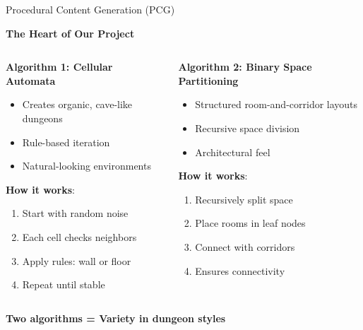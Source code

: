 \documentclass{beamer}
\begin{document}
\begin{frame}{Procedural Content Generation (PCG)}
    \begin{center}
        \textbf{The Heart of Our Project}
    \end{center}

    \begin{columns}[T]
        \begin{column}{0.48\textwidth}
            \textbf{Algorithm 1: Cellular Automata}
            \begin{itemize}
                \item Creates organic, cave-like dungeons
                \item Rule-based iteration
                \item Natural-looking environments
            \end{itemize}

            \vspace{0.6cm}
            \textbf{How it works}:
            \begin{enumerate}\small
                \item Start with random noise
                \item Each cell checks neighbors
                \item Apply rules: wall or floor
                \item Repeat until stable
            \end{enumerate}
        \end{column}

        \begin{column}{0.48\textwidth}
            \textbf{Algorithm 2: Binary Space Partitioning}
            \begin{itemize}
                \item Structured room-and-corridor layouts
                \item Recursive space division
                \item Architectural feel
            \end{itemize}

            \vspace{0.2cm}
            \textbf{How it works}:
            \begin{enumerate}\small
                \item Recursively split space
                \item Place rooms in leaf nodes
                \item Connect with corridors
                \item Ensures connectivity
            \end{enumerate}
        \end{column}
    \end{columns}

    \vspace{0.3cm}
    \begin{center}
        \textcolor{ubburgundy}{\textbf{Two algorithms = Variety in dungeon styles}}
    \end{center}
\end{frame}
\end{document}
